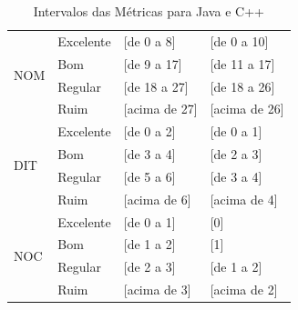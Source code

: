 \begin{table}[!ht]
\begin{center}
\begin{tabular}{ |l|l|l|l| }
		\multirow{4}{*}{NOM} 
		 & Excelente & [de 0 a 8] & [de 0 a 10] \\
		 & Bom & [de 9 a 17] & [de 11 a 17] \\
		 & Regular & [de 18 a 27] & [de 18 a 26] \\
		 & Ruim & [acima de 27] & [acima de 26] \\ \hline
		 
		\multirow{4}{*}{DIT} 
		 & Excelente & [de 0 a 2] & [de 0 a 1] \\
		 & Bom & [de 3 a 4] & [de 2 a 3] \\
		 & Regular & [de 5 a 6] & [de 3 a 4] \\
		 & Ruim & [acima de 6] & [acima de 4] \\ \hline
		
		\multirow{4}{*}{NOC} 
		 & Excelente & [de 0 a 1] & [0] \\
		 & Bom & [de 1 a 2] & [1] \\
		 & Regular & [de 2 a 3] & [de 1 a 2] \\
		 & Ruim & [acima de 3] & [acima de 2] \\ \hline
		 
	\end{tabular}
	\caption{Intervalos das Métricas para Java e C++}
	\label{metrics}
	\end{center}
	\end{table}


	
	
	